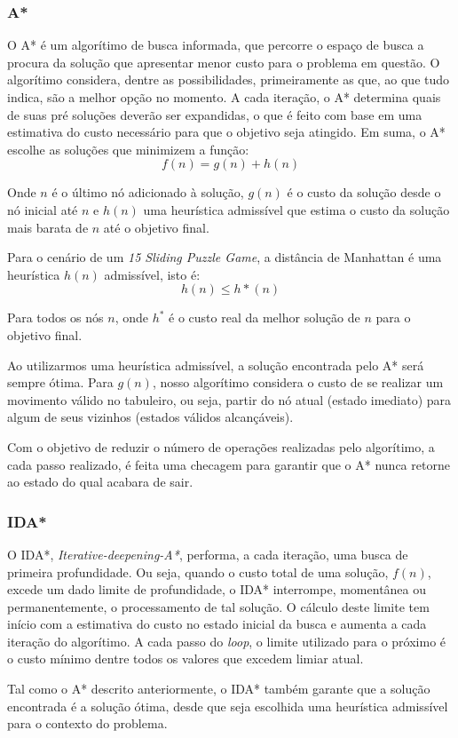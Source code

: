 \documentclass[12pt,a4paper]{article}
\begin{document}
\subsubsection{A*}
\par O A* é um algorítimo de busca informada, que percorre o espaço de busca a procura da solução que apresentar menor custo para o problema em questão. O algorítimo considera, dentre as possibilidades, primeiramente as que, ao que tudo indica, são a melhor opção no momento. A cada iteração, o A* determina quais de suas pré soluções deverão ser expandidas, o que é feito com base em uma estimativa do custo necessário para que o objetivo seja atingido. Em suma, o A* escolhe as soluções que minimizem a função:
\[f(n)=g(n)+h(n)\]
\par Onde $n$ é o último nó adicionado à solução, $g(n)$ é o custo da solução desde o nó inicial até $n$ e $h(n)$ uma heurística admissível que estima o custo da solução mais barata de $n$ até o objetivo final.
\par Para o cenário de um \textit{15 Sliding Puzzle Game}, a distância de Manhattan é uma heurística $h(n)$ admissível, isto é:
\[h(n) \leq h*(n)\]
\par Para todos os nós $n$, onde $h^{*}$ é o custo real da melhor solução de $n$ para o objetivo final.
\par Ao utilizarmos uma heurística admissível, a solução encontrada pelo A* será sempre ótima. Para $g(n)$, nosso algorítimo considera o custo de se realizar um movimento válido no tabuleiro, ou seja, partir do nó atual (estado imediato) para algum de seus vizinhos (estados válidos alcançáveis).
\par Com o objetivo de reduzir o número de operações realizadas pelo algorítimo, a cada passo realizado, é feita uma checagem para garantir que o A* nunca retorne ao estado do qual acabara de sair.
\subsubsection{IDA*}

\par O IDA*, \textit{Iterative-deepening-A*}, performa, a cada iteração, uma busca de primeira profundidade. Ou seja, quando o custo total de uma solução, $f(n)$, excede um dado limite de profundidade, o IDA* interrompe, momentânea ou permanentemente, o processamento de tal solução. O cálculo deste limite tem início com a estimativa do custo no estado inicial da busca e aumenta a cada iteração do algorítimo. A cada passo do \textit{loop}, o limite utilizado para o próximo é o custo mínimo dentre todos os valores que excedem limiar atual.
\par Tal como o A* descrito anteriormente, o IDA* também garante que a solução encontrada é a solução ótima, desde que seja escolhida uma heurística admissível para o contexto do problema.
\end{document}
